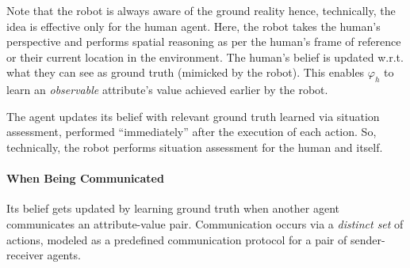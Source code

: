 \documentclass[letterpaper]{article} %
\begin{document}
Note that the robot is always aware of the ground reality hence, technically, the idea 
is effective only for the human agent. Here, the robot takes the human's perspective and performs spatial reasoning as per the human's frame of reference or their current location in the environment. 
The human's belief is updated w.r.t. what they can see as ground truth (mimicked by the robot).
This enables $\varphi_h$ to learn an \textit{observable} attribute's value achieved earlier by the robot.
% 

The agent updates its belief with relevant ground truth learned via situation assessment, performed ``immediately'' after the execution of each action. So, technically, the robot performs situation assessment for the human and itself.

\paragraph{When Being Communicated}
Its belief gets updated by learning ground truth when another agent communicates an attribute-value pair. Communication occurs via a \textit{distinct set} of actions, modeled as a predefined communication protocol for a pair of sender-receiver agents. 
\end{document}
